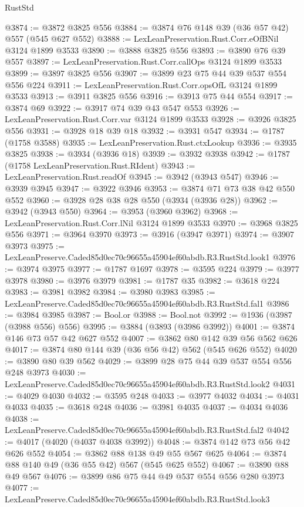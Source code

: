 \begin{lexlean}{RustStd}
\begin{coremodule}
@3874 := @3872 @3825 @556
@3884 := @3874 @76 @148 @39 (@36 @57 @42) @557 (@545 @627 @552)
@3888 := LexLeanPreservation.Rust.Corr.eOfBNil @3124 @1899 @3533
@3890 := @3888 @3825 @556
@3893 := @3890 @76 @39 @557
@3897 := LexLeanPreservation.Rust.Corr.callOps @3124 @1899 @3533
@3899 := @3897 @3825 @556
@3907 := @3899 @23 @75 @44 @39 @537 @554 @556 @224
@3911 := LexLeanPreservation.Rust.Corr.opsOfL @3124 @1899 @3533
@3913 := @3911 @3825 @556
@3916 := @3913 @75 @44 @554
@3917 := @3874 @69
@3922 := @3917 @74 @39 @43 @547 @553
@3926 := LexLeanPreservation.Rust.Corr.var @3124 @1899 @3533
@3928 := @3926 @3825 @556
@3931 := @3928 @18 @39 @18
@3932 := @3931 @547
@3934 := @1787 (@1758 @3588)
@3935 := LexLeanPreservation.Rust.ctxLookup
@3936 := @3935 @3825
@3938 := @3934 (@3936 @18)
@3939 := @3932 @3938
@3942 := @1787 (@1758 LexLeanPreservation.Rust.RIdent)
@3943 := LexLeanPreservation.Rust.readOf
@3945 := @3942 (@3943 @547)
@3946 := @3939 @3945
@3947 := @3922 @3946
@3953 := @3874 @71 @73 @38 @42 @550 @552
@3960 := @3928 @28 @38 @28 @550 (@3934 (@3936 @28))
@3962 := @3942 (@3943 @550)
@3964 := @3953 (@3960 @3962)
@3968 := LexLeanPreservation.Rust.Corr.lNil @3124 @1899 @3533
@3970 := @3968 @3825 @556
@3971 := @3964 @3970
@3973 := @3916 (@3947 @3971)
@3974 := @3907 @3973
@3975 := LexLeanPreserve.Caded85d0ec70c96655a45904ef60abdb.R3.RustStd.look1
@3976 := @3974 @3975
@3977 := @1787 @1697
@3978 := @3595 @224
@3979 := @3977 @3978
@3980 := @3976 @3979
@3981 := @1787 @35
@3982 := @3618 @224
@3983 := @3981 @3982
@3984 := @3980 @3983
@3985 := LexLeanPreserve.Caded85d0ec70c96655a45904ef60abdb.R3.RustStd.fal1
@3986 := @3984 @3985
@3987 := Bool.or
@3988 := Bool.not
@3992 := @1936 (@3987 (@3988 @556) @556)
@3995 := @3884 (@3893 (@3986 @3992))
@4001 := @3874 @146 @73 @57 @42 @627 @552
@4007 := @3862 @80 @142 @39 @56 @562 @626
@4017 := @3874 @80 @144 @39 (@36 @56 @42) @562 (@545 @626 @552)
@4020 := @3890 @80 @39 @562
@4029 := @3899 @28 @75 @44 @39 @537 @554 @556 @248 @3973
@4030 := LexLeanPreserve.Caded85d0ec70c96655a45904ef60abdb.R3.RustStd.look2
@4031 := @4029 @4030
@4032 := @3595 @248
@4033 := @3977 @4032
@4034 := @4031 @4033
@4035 := @3618 @248
@4036 := @3981 @4035
@4037 := @4034 @4036
@4038 := LexLeanPreserve.Caded85d0ec70c96655a45904ef60abdb.R3.RustStd.fal2
@4042 := @4017 (@4020 (@4037 @4038 @3992))
@4048 := @3874 @142 @73 @56 @42 @626 @552
@4054 := @3862 @88 @138 @49 @55 @567 @625
@4064 := @3874 @88 @140 @49 (@36 @55 @42) @567 (@545 @625 @552)
@4067 := @3890 @88 @49 @567
@4076 := @3899 @86 @75 @44 @49 @537 @554 @556 @280 @3973
@4077 := LexLeanPreserve.Caded85d0ec70c96655a45904ef60abdb.R3.RustStd.look3

\end{coremodule}
\end{lexlean}
